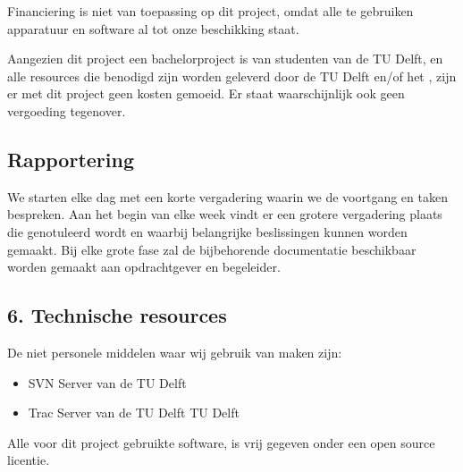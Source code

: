 Financiering is niet van toepassing op dit project, omdat alle te gebruiken apparatuur en software al tot onze beschikking staat.

Aangezien dit project een bachelorproject is van studenten van de TU Delft, en alle resources die benodigd zijn worden geleverd door de TU Delft en/of het \casamproject, zijn er met dit project geen kosten gemoeid. Er staat waarschijnlijk ook geen vergoeding tegenover.

\subsection{Rapportering}

We starten elke dag met een korte vergadering waarin we de voortgang en taken bespreken. Aan het begin van elke week vindt er een grotere vergadering plaats die genotuleerd wordt en waarbij belangrijke beslissingen kunnen worden gemaakt. Bij elke grote fase zal de bijbehorende documentatie beschikbaar worden gemaakt aan opdrachtgever en begeleider.

\subsection{6.	Technische resources}

De niet personele middelen waar wij gebruik van maken zijn:
\begin{itemize}
	\item SVN Server van de TU Delft
	\item Trac Server van de TU Delft
TU Delft

\end{itemize}
Alle voor dit project gebruikte software, is vrij gegeven onder een open source licentie.
